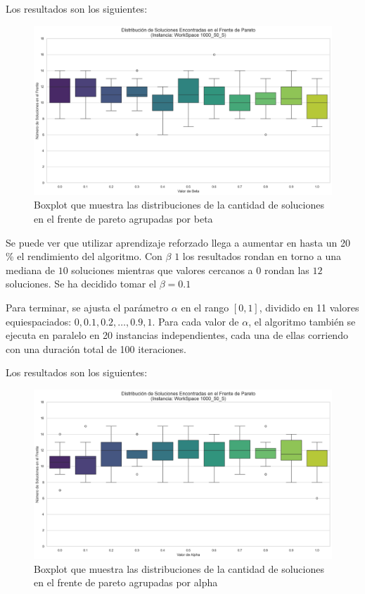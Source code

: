 \documentclass[12pt,a4paper]{book}
\begin{document}
Los resultados son los siguientes:

\begin{figure}[H]
    \centering
    \includegraphics[width=\linewidth]{images_finetuning/beta_20_100.png}
    \caption{Boxplot que muestra las distribuciones de la cantidad de soluciones en el frente de pareto agrupadas por beta }
    \label{fig:beta}
\end{figure}

Se puede ver que utilizar aprendizaje reforzado llega a aumentar en hasta un 20 \% el rendimiento del algoritmo. Con $\beta$ $1$ los resultados rondan en torno a una mediana de $10$ soluciones mientras que valores cercanos a $0$ rondan las $12$ soluciones. Se ha decidido tomar el $\beta=0.1$

Para terminar, se ajusta el parámetro $\alpha$ en el rango $[0,1]$, dividido en 11 valores equiespaciados: $0, 0.1, 0.2, \dots, 0.9, 1$.  
Para cada valor de $\alpha$, el algoritmo también se ejecuta en paralelo en 20 instancias independientes, cada una de ellas corriendo con una duración total de 100 iteraciones.

Los resultados son los siguientes:

\begin{figure}[H]
    \centering
    \includegraphics[width=\linewidth]{images_finetuning/alpha_20_100}
    \caption{Boxplot que muestra las distribuciones de la cantidad de soluciones en el frente de pareto agrupadas por alpha}
    \label{fig:alpha}
\end{figure}
\end{document}
